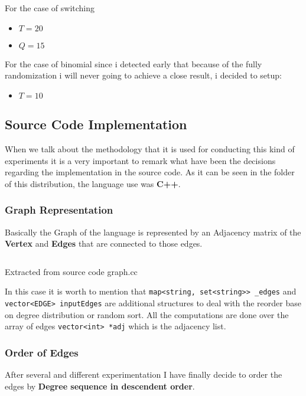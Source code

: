\documentclass[12pt, a4paper]{article}
\begin{document}
For the case of \acrshort{switching}
\begin{itemize}
    \item $T = 20$ 
    \item $Q = 15$
\end{itemize}

For the case of \acrshort{binomial} since i detected early that because of the fully randomization i will never going to achieve a close result, i decided
to setup:
\begin{itemize}
    \item $T = 10$ 
\end{itemize}


\subsection{Source Code Implementation}
When we talk about the methodology that it is used for conducting this kind of experiments it is a very important to remark what have been the decisions regarding the implementation in the source
code.
As it can be seen in the folder of this distribution, the language use was \textbf{C++}.

\subsubsection{Graph Representation}

Basically the Graph of the language is represented by an Adjacency matrix of the \textbf{Vertex} and \textbf{Edges} that are connected to those edges.

\begin{listing}[H]
    \inputminted[firstline=44, lastline=51, breaklines]{cpp}{../src/domain/graph.cc}
    \caption{Extracted from source code graph.cc}
    \label{source:code:1}
\end{listing}  

In this case it is worth to mention that \texttt{map<string, set<string>> _edges} and \texttt{vector<EDGE> inputEdges} are additional 
structures to deal with the reorder base on degree distribution or random sort. 
All the computations are done over the array of edges \texttt{vector<int> *adj} which is the adjacency list.

\subsubsection{Order of Edges}
After several and different experimentation I have finally decide to order the edges by \textbf{Degree sequence in descendent order}.
\end{document}
